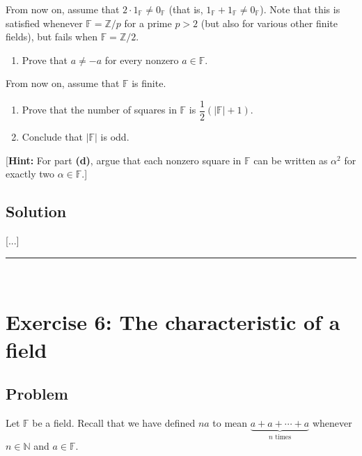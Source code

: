 \documentclass[paper=a4, fontsize=12pt]{scrartcl} %
\newcommand{\NN}{\mathbb{N}} %
\newcommand{\FF}{\mathbb{F}} %
\newcommand{\ZZ}{\mathbb{Z}} %
\newcommand{\abs}[1]{\left| #1 \right|}
\newcommand{\tup}[1]{\left( #1 \right)}
\newcommand{\horrule}[1]{\rule{\linewidth}{#1}} %
\theoremstyle{plainsl}
\theoremstyle{definition}
\theoremstyle{remark}
\begin{document}
From now on, assume that $2 \cdot 1_{\FF} \neq 0_{\FF}$ (that is,
$1_{\FF} + 1_{\FF} \neq 0_{\FF}$). Note that this is
satisfied whenever $\FF = \ZZ / p$ for a prime $p > 2$ (but also for
various other finite fields), but fails when $\FF = \ZZ / 2$.

\begin{enumerate}

\item[\textbf{(c)}] Prove that $a \neq -a$ for every
nonzero $a \in \FF$.

\end{enumerate}

From now on, assume that $\FF$ is finite.

\begin{enumerate}

\item[\textbf{(d)}] Prove that the number of squares in $\FF$ is
$\dfrac{1}{2} \tup{ \abs{\FF} + 1 }$.

\item[\textbf{(e)}] Conclude that $\abs{\FF}$ is odd.

\end{enumerate}

[\textbf{Hint:} For part \textbf{(d)}, argue that each nonzero square in
$\FF$ can be written as $\alpha^2$ for exactly two $\alpha \in \FF$.]

\subsection{Solution}

[...]

\horrule{0.3pt} \\[0.4cm]

\section{Exercise 6: The characteristic of a field}

\subsection{Problem}

Let $\FF$ be a field.
Recall that we have defined $na$ to mean
$\underbrace{a + a + \cdots + a}_{n \text{ times}}$ whenever
$n \in \NN$ and $a \in \FF$.
\end{document}
